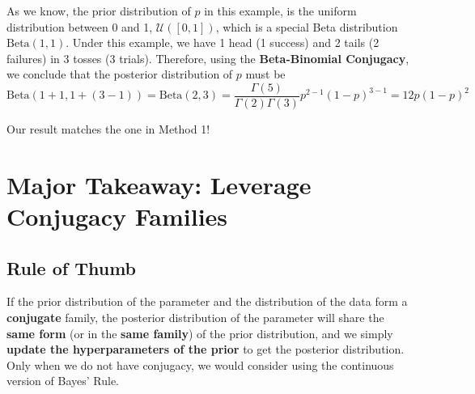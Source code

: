 \documentclass{article}
\begin{document}
As we know, the prior distribution of $p$ in this example, is the uniform distribution between 0 and 1, $\mathcal{U}([0,1])$, which is a special Beta distribution $\text{Beta}(1, 1)$. Under this example, we have 1 head (1 success) and 2 tails (2 failures) in 3 tosses (3 trials). Therefore, using the \textbf{Beta-Binomial Conjugacy}, we conclude that the posterior distribution of $p$ must be 
$$ \text{Beta}(1+1, 1+(3-1)) = \text{Beta}(2, 3) = \frac{\Gamma(5)}{\Gamma(2)\Gamma(3)}p^{2-1}(1-p)^{3-1} = 12p(1-p)^2 $$

Our result matches the one in Method 1!

\section{Major Takeaway: Leverage Conjugacy Families}

\subsection{Rule of Thumb}
\begin{displayquote}
If the prior distribution of the parameter and the distribution of the data form a \textbf{conjugate} family, the posterior distribution of the parameter will share the \textbf{same form} (or in the \textbf{same family}) of the prior distribution, and we simply \textbf{update the hyperparameters of the prior} to get the posterior distribution.\\

Only when we do not have conjugacy, we would consider using the continuous version of Bayes' Rule.
\end{displayquote}
\end{document}
